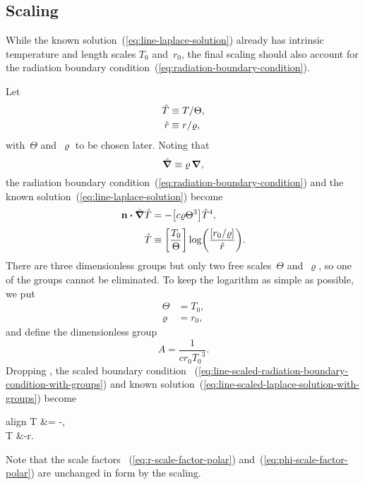 \subsection{Scaling}
\label{sec:polar.line.scaling}

While the known solution~(\ref{eq:line-laplace-solution})
already has intrinsic temperature and length scales $T_0$ and~$r_0$,
the final scaling should also account for
the radiation boundary condition~(\ref{eq:radiation-boundary-condition}).

Let
\begin{align}
  \hat{T} &\equiv T / \Theta, \label{eq:line-scaled-temperature} \\
  \hat{r} &\equiv r / \varrho, \label{eq:line-scaled-r}
\end{align}
with~$\Theta$ and~$\varrho$ to be chosen later.
Noting that
\begin{equation}
  \mathop{}\!\hat{\mathop{}\!\boldsymbol{\mathbf{\nabla}}} \equiv \varrho \mathop{}\!\boldsymbol{\mathbf{\nabla}},
  \label{eq:line-scaled-del}
\end{equation}
the radiation boundary condition~(\ref{eq:radiation-boundary-condition})
and the known solution~(\ref{eq:line-laplace-solution})
become
\begin{align}
  \normalvec \dotp \scaleddel \scaled{T}
    &= -\group{c \varrho \Theta^3} \scaled{T}^4,
    \label{eq:line-scaled-radiation-boundary-condition-with-groups}
    \\[\tallspace]
  \scaled{T}
    &\ideq
      \group{\frac{T_0}{\Theta}}
      \log \roundbr*{\frac{\group{r_0 / \varrho}}{\scaled{r}}}.
    \label{eq:line-scaled-laplace-solution-with-groups}
\end{align}
There are three dimensionless groups
but only two free scales~$\Theta$ and~$\varrho$,
so one of the groups cannot be eliminated.
To keep the logarithm as simple as possible,
we put
\begin{align}
  \Theta &= T_0,
    \label{eq:line-temperature-scale} \\
  \varrho &= r_0,
    \label{eq:line-length-scale}
\end{align}
and define the dimensionless group
\begin{equation}
  A = \frac{1}{c r_0 {T_0}^3}.
  \label{eq:line-dimensionless-group}
\end{equation}
Dropping \scalingmarks, the scaled boundary condition~%
  (\ref{eq:line-scaled-radiation-boundary-condition-with-groups})
and known solution~(\ref{eq:line-scaled-laplace-solution-with-groups})
become
\begin{important}{align}
  \normalvec \dotp \del T &= -,
    \label{eq:line-scaled-radiation-boundary-condition} \\[\tallspace]
  T &\ideq -\log r.
    \label{eq:line-scaled-laplace-solution}
\end{important}
Note that the scale factors~%
  (\ref{eq:r-scale-factor-polar}) and~(\ref{eq:phi-scale-factor-polar})
are unchanged in form by the scaling.

